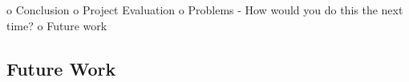 o   Conclusion
o   Project Evaluation
o   Problems - How would you do this the next time?
o   Future work

\subsection{Future Work}
\label{subsec:futurework}

